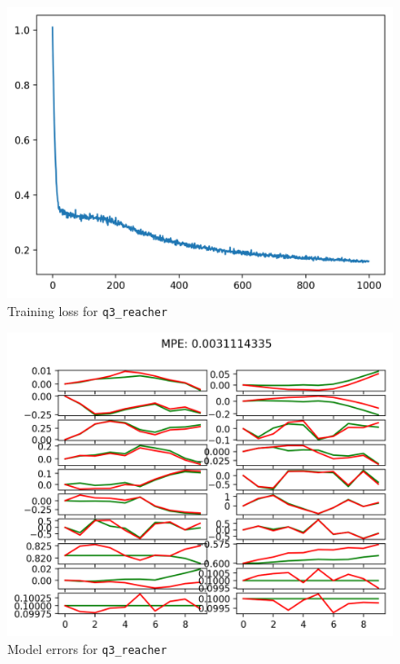 \documentclass[11pt]{article}
\begin{document}
\begin{figure}[htbp]
\centering
\includegraphics[width=.9\linewidth]{./hw2_q3_reacher_reacher-ift6163-v0_17-02-2022_21-58-46/itr_0_losses.png}
\caption{Training loss for \texttt{q3\_reacher}}
\end{figure}

\begin{figure}[htbp]
\centering
\includegraphics[width=.9\linewidth]{./hw2_q3_reacher_reacher-ift6163-v0_17-02-2022_21-58-46/itr_0_predictions.png}
\caption{Model errors for \texttt{q3\_reacher}}
\end{figure}
\end{document}
